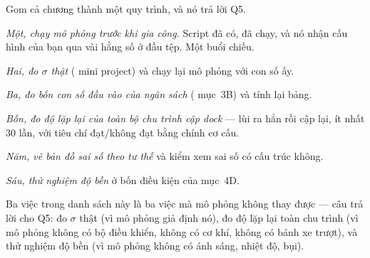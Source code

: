 \documentclass[../../marker.tex]{subfiles}
\begin{document}
Gom cả chương thành một quy trình, và nó trả lời Q5.

\emph{Một, chạy mô phỏng trước khi gia công.} Script đã có, đã chạy, và nó nhận cấu hình của bạn qua vài hằng số ở đầu tệp. Một buổi chiều.

\emph{Hai, đo \(\sigma\) thật} ( mini project) và chạy lại mô phỏng với con số ấy.

\emph{Ba, đo bốn con số đầu vào của ngân sách} ( mục~3B) và tính lại bảng.

\emph{Bốn, đo độ lặp lại của toàn bộ chu trình cập dock} --- lùi ra hẳn rồi cập lại, ít nhất 30 lần, với tiêu chí đạt/không đạt bằng chính cơ cấu.

\emph{Năm, vẽ bản đồ sai số theo tư thế} và kiểm xem sai số có cấu trúc không.

\emph{Sáu, thử nghiệm độ bền} ở bốn điều kiện của mục~4D.

Ba việc trong danh sách này là ba việc mà mô phỏng không thay được --- câu trả lời cho Q5: đo \(\sigma\) thật (vì mô phỏng giả định nó), đo độ lặp lại toàn chu trình (vì mô phỏng không có bộ điều khiển, không có cơ khí, không có bánh xe trượt), và thử nghiệm độ bền (vì mô phỏng không có ánh sáng, nhiệt độ, bụi).
\end{document}
